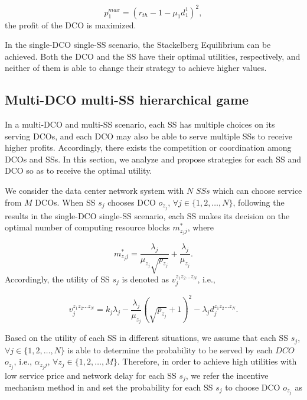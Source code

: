 \documentclass[twocolumn,10pt]{IEEEtran}
\begin{document}
\begin{equation}
    {p_1^{max}}={({r_{th}} - 1 - {\mu _1}{d^1_{1}})^2},
\end{equation}
the profit of the DCO is maximized.


In the single-DCO single-SS scenario, the Stackelberg Equilibrium can be achieved. Both the DCO and the SS have their optimal utilities, respectively, and neither of them is able to change their strategy to achieve higher values.


\subsection{Multi-DCO multi-SS hierarchical game}

In a multi-DCO and multi-SS scenario, each SS has multiple choices on its serving DCOs, and each DCO may also be able to serve multiple SSs to receive higher profits. Accordingly, there exists the competition or coordination among DCOs and SSs. In this section, we analyze and propose strategies for each SS and DCO so as to receive the optimal utility.



We consider the data center network system with $N$ $SSs$ which can choose service from $M$ DCOs. When SS $s_j$ chooses DCO $o_{z_j}$, $\forall j \in \{1,2,\ldots,N\}$, following the results in the single-DCO single-SS scenario, each SS makes its decision on the optimal number of computing resource blocks $m_{{z_j}j}^{*}$, where

\begin{equation}\label{optimal_ss}
    m_{{z_j}j}^*=\frac{{{\lambda _{j}}}}{{{\mu _{z_j}}\sqrt {{p_{z_j}}} }} + \frac{{{\lambda _{j}}}}{{{\mu _{z_j}}}}.
\end{equation}
Accordingly, the utility of SS $s_j$ is denoted as $v^{z_1z_2\ldots z_N}_{j}$, i.e.,

\begin{equation}
    v^{z_1z_2\ldots z_N}_{j}= k_j \lambda_j - \frac{{{\lambda _{j}}}}{{{\mu _{z_j}}}}{(\sqrt {{p_{z_j}}}  + 1)^2}- {\lambda _{j}}{d^{z_1z_2\ldots z_N}_{j}}.
\end{equation}



Based on the utility of each SS in different situations, we assume that each SS $s_j$, $\forall j \in \{1,2,\ldots,N\}$ is able to determine the probability to be served by each $DCO$ $o_{z_j}$, i.e., $\alpha_{{z_j}j}$, $\forall z_j \in \{1,2,\ldots,M\}$. Therefore, in order to achieve high utilities with low service price and network delay for each SS $s_j$, we refer the incentive mechanism method in \cite{YChen} and set the probability for each SS $s_j$ to choose DCO $o_{z_j}$ as
\end{document}
